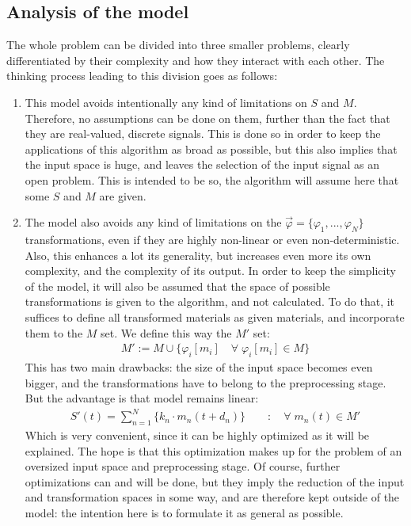 \documentclass[11pt]{scrartcl} %
\begin{document}
  \subsection*{Analysis of the model}
  The whole problem can be divided into three smaller problems, clearly differentiated by their complexity and how they interact with each other. The thinking process leading to this division goes as follows:
  \begin{enumerate}
  \item This model avoids intentionally any kind of limitations on \(S\) and \(M\). Therefore, no assumptions can be done on them, further than the fact that they are real-valued, discrete signals. This is done so in order to keep the applications of this algorithm as broad as possible, but this also implies that the input space is huge, and leaves the selection of the input signal as an open problem. This is intended to be so, the algorithm will assume here that some \(S\) and \(M\) are given.
  \item The model also avoids any kind of limitations on the \(\vec{\varphi}=\{\varphi_1, ..., \varphi_N\}\) transformations, even if they are highly non-linear or even non-deterministic. Also, this enhances a lot its generality, but increases even more its own complexity, and the complexity of its output. In order to keep the simplicity of the model, it will also be assumed that the space of possible transformations is given to the algorithm, and not calculated. To do that, it suffices to define all transformed materials as given materials, and incorporate them to the \(M\) set. We define this way the \(M'\) set:
    \begin{align*}
    M' := M \cup \{\varphi_i[m_i] \quad\forall\; \varphi_i[m_i]\in M\}
    \end{align*}
    This has two main drawbacks: the size of the input space becomes even bigger, and the transformations have to belong to the preprocessing stage. But the advantage is that model remains linear:
    \begin{align*}
    S'{\scriptstyle (t)} = \sum_{n=1}^N\{k_n\cdot m_n{\scriptstyle (t+d_n)}\} \qquad : \quad \forall\; m_n{\scriptstyle (t)}  \in M'
    \end{align*}
    Which is very convenient, since it can be highly optimized as it will be explained. The hope is that this optimization makes up for the problem of an oversized input space and preprocessing stage. Of course, further optimizations can and will be done, but they imply the reduction of the input and transformation spaces in some way, and are therefore kept outside of the model: the intention here is to formulate it as general as possible.

\end{enumerate}
\end{document}
